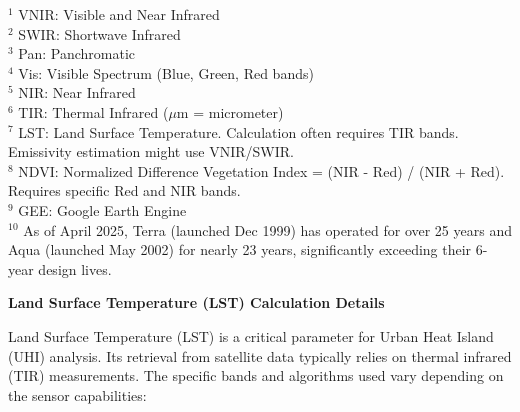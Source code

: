\documentclass{article}
\begin{document}
\bigskip %

\noindent \footnotesize
$^1$ VNIR: Visible and Near Infrared \\
$^2$ SWIR: Shortwave Infrared \\
$^3$ Pan: Panchromatic \\
$^4$ Vis: Visible Spectrum (Blue, Green, Red bands) \\
$^5$ NIR: Near Infrared \\
$^6$ TIR: Thermal Infrared ($\mu$m = micrometer) \\
$^7$ LST: Land Surface Temperature. Calculation often requires TIR bands. Emissivity estimation might use VNIR/SWIR. \\
$^8$ NDVI: Normalized Difference Vegetation Index = (NIR - Red) / (NIR + Red). Requires specific Red and NIR bands. \\
$^9$ GEE: Google Earth Engine \\
$^{10}$ As of April 2025, Terra (launched Dec 1999) has operated for over 25 years and Aqua (launched May 2002) for nearly 23 years, significantly exceeding their 6-year design lives.

\bigskip

\noindent \textbf{Land Surface Temperature (LST) Calculation Details}

\medskip

Land Surface Temperature (LST) is a critical parameter for Urban Heat Island (UHI) analysis. Its retrieval from satellite data typically relies on thermal infrared (TIR) measurements. The specific bands and algorithms used vary depending on the sensor capabilities:

\vspace{1em}
\end{document}
